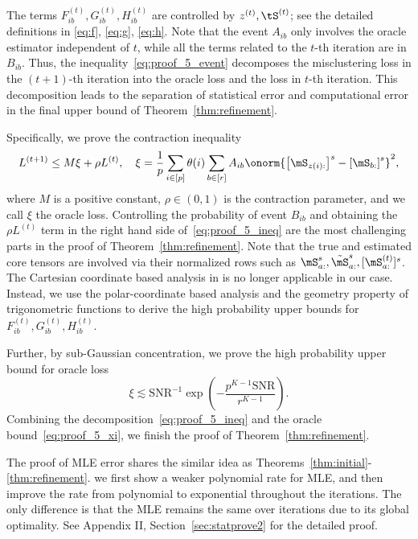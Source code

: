 \documentclass[lettersize,onecolumn,journal]{IEEEtran}
\theoremstyle{definition}
\theoremstyle{definition}
\newcommand{\of}[1]{\left(#1\right)}
\newcommand{\off}[1]{\left[#1\right]}
\begin{document}
The terms $F_{ib}^{(t)}, G_{ib}^{(t)}, H_{ib}^{(t)}$ are controlled by $z^{(t)}, \tS^{(t)}$; see the detailed definitions in \eqref{eq:f}, \eqref{eq:g}, \eqref{eq:h}. Note that the event $A_{ib}$ only involves the oracle estimator independent of $t$, while all the terms related to the $t$-th iteration are in $B_{ib}$. Thus, the inequality~\eqref{eq:proof_5_event} decomposes the misclustering loss in the $(t+1)$-th iteration into the oracle loss and the loss in $t$-th iteration. This decomposition leads to the separation of statistical error and computational error in the final upper bound of Theorem~\ref{thm:refinement}.

Specifically, we prove the contraction inequality
\begin{equation}\label{eq:proof_5_ineq}
    L^{(t+1)} \leq M \xi + \rho L^{(t)}, \quad \xi = \frac{1}{p}  \sum_{i \in [p]} \theta(i) \sum_{b \in [r]}  A_{ib} \onorm{ \off{ \mS_{ z(i):}  }^s - \off{ \mS_{b:}  }^s  }^2,
\end{equation}
where $M$ is a positive constant, $\rho \in (0,1)$ is the contraction parameter, and we call $\xi$ the oracle loss. Controlling the probability of event $B_{ib}$ and obtaining the $\rho L^{(t)}$ term in the right hand side of~\eqref{eq:proof_5_ineq} are the most challenging parts in the proof of Theorem~\ref{thm:refinement}. Note that the true and estimated core tensors are involved via their normalized rows such as $\mS_{a:}^s, \tilde \mS_{a:}^s, [\mS^{(t)}_{a:}]^s$. The Cartesian coordinate based analysis in \cite{han2020exact} is no longer applicable in our case. Instead, we use the polar-coordinate based analysis and the geometry property of trigonometric functions to derive the high probability upper bounds for $F_{ib}^{(t)}, G_{ib}^{(t)}, H_{ib}^{(t)}$. 

Further, by sub-Gaussian concentration, we prove the high probability upper bound for oracle loss
\begin{equation}\label{eq:proof_5_xi}
    \xi  \lesssim {\text{SNR}^{-1}}\exp\of{- \frac{p^{K-1}\text{SNR}}{r^{K-1}}}.
\end{equation}
Combining the decomposition~\eqref{eq:proof_5_ineq} and the oracle bound~\eqref{eq:proof_5_xi}, we finish the proof of Theorem~\ref{thm:refinement}.

{  
The proof of MLE error shares the similar idea as Theorems~\ref{thm:initial}-\ref{thm:refinement}. we first show a weaker polynomial rate for MLE, and then improve the rate from polynomial to exponential throughout the iterations. The only difference is that the MLE remains the same over iterations due to its global optimality. See Appendix II, Section~\ref{sec:statprove2} for the detailed proof.}
\end{document}
